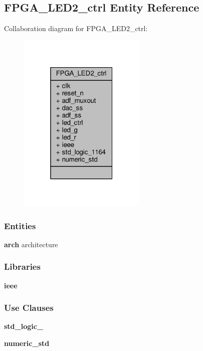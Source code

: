 \subsection{F\+P\+G\+A\+\_\+\+L\+E\+D2\+\_\+ctrl Entity Reference}
\label{classFPGA__LED2__ctrl}


Collaboration diagram for F\+P\+G\+A\+\_\+\+L\+E\+D2\+\_\+ctrl\+:\nopagebreak
\begin{figure}[H]
\begin{center}
\leavevmode
\includegraphics[width=172pt]{dd/da2/classFPGA__LED2__ctrl__coll__graph}
\end{center}
\end{figure}
\subsubsection*{Entities}
\begin{DoxyCompactItemize}
\item 
{\bf arch} architecture
\end{DoxyCompactItemize}
\subsubsection*{Libraries}
 \begin{DoxyCompactItemize}
\item 
{\bf ieee} 
\end{DoxyCompactItemize}
\subsubsection*{Use Clauses}
 \begin{DoxyCompactItemize}
\item 
{\bf std\+\_\+logic\+\_}   
\item 
{\bf numeric\+\_\+std}   
\end{DoxyCompactItemize}
